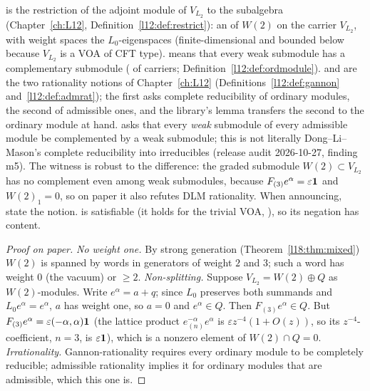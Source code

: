 \begin{dictionary}
 is the restriction of the adjoint module of $V_{L_2}$ to the subalgebra
(Chapter~\ref{ch:L12}, Definition~\ref{l12:def:restrict}): an  of $W(2)$ on the carrier
$V_{L_2}$, with weight spaces the $L_0$-eigenspaces (finite-dimensional and bounded below because
$V_{L_2}$ is a VOA of CFT type).  means that every weak
submodule has a complementary submodule ( of carriers; Definition~\ref{l12:def:ordmodule}).
 and  are the two rationality notions of
Chapter~\ref{ch:L12} (Definitions~\ref{l12:def:gannon} and~\ref{l12:def:admrat}); the first asks complete
reducibility of ordinary modules, the second of admissible ones, and the library's lemma
 transfers the second to the ordinary module at hand.
 asks that every \emph{weak} submodule of every admissible module be complemented by a weak
submodule; this is not literally Dong--Li--Mason's complete reducibility into irreducibles (release audit 2026-10-27,
finding m5). The witness is robust to the difference: the graded submodule $W(2)\subset V_{L_2}$ has no complement even
among weak submodules, because $F_{(3)}e^\alpha=\varepsilon\mathbf{1}$ and $W(2)_1=0$, so on paper it also refutes DLM
rationality. When announcing, state the notion.  is satisfiable (it holds for the trivial
VOA, ), so its negation has content.
\end{dictionary}
\begin{proof}[Proof on paper]
\emph{No weight one.} By strong generation (Theorem~\ref{l18:thm:mixed}) $W(2)$ is spanned by words in
generators of weight $2$ and $3$; such a word has weight $0$ (the vacuum) or $\ge2$. \emph{Non-splitting.}
Suppose $V_{L_2}=W(2)\oplus Q$ as $W(2)$-modules. Write $e^\alpha=a+q$; since $L_0$ preserves both summands and
$L_0e^\alpha=e^\alpha$, $a$ has weight one, so $a=0$ and $e^\alpha\in Q$. Then $F_{(3)}e^\alpha\in Q$. But
$F_{(3)}e^\alpha=\varepsilon(-\alpha,\alpha)\mathbf{1}$ (the lattice product $e^{-\alpha}_{(n)}e^\alpha$ is
$\varepsilon z^{-4}(1+O(z))$, so its $z^{-4}$-coefficient, $n=3$, is $\varepsilon\mathbf{1}$), which is a nonzero element of
$W(2)\cap Q=0$. \emph{Irrationality.} Gannon-rationality requires every ordinary module to be completely
reducible; admissible rationality implies it for ordinary modules that are admissible, which this one is.
\end{proof}
